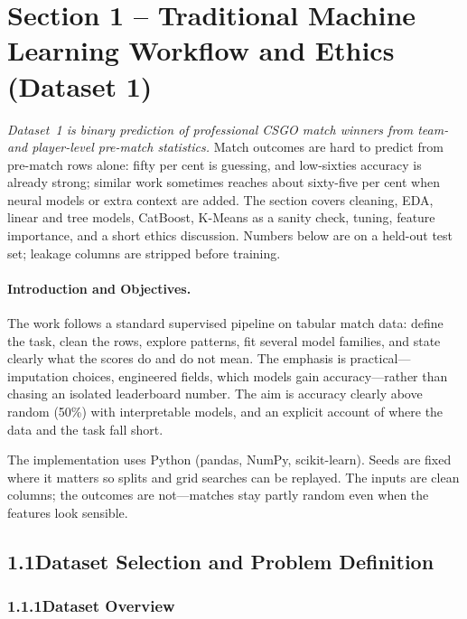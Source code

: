 \documentclass[12pt,a4paper]{article}
\begin{document}
\section{Section 1 -- Traditional Machine Learning Workflow and Ethics (Dataset 1)}

\noindent\textit{Dataset~1 is binary prediction of professional CSGO match winners from team- and player-level pre-match statistics.} Match outcomes are hard to predict from pre-match rows alone: fifty per cent is guessing, and low-sixties accuracy is already strong; similar work sometimes reaches about sixty-five per cent when neural models or extra context are added. The section covers cleaning, EDA, linear and tree models, CatBoost, K-Means as a sanity check, tuning, feature importance, and a short ethics discussion. Numbers below are on a held-out test set; leakage columns are stripped before training.

\paragraph{Introduction and Objectives.}
The work follows a standard supervised pipeline on tabular match data: define the task, clean the rows, explore patterns, fit several model families, and state clearly what the scores do and do not mean. The emphasis is practical---imputation choices, engineered fields, which models gain accuracy---rather than chasing an isolated leaderboard number. The aim is accuracy clearly above random (50\%) with interpretable models, and an explicit account of where the data and the task fall short.

The implementation uses Python (pandas, NumPy, scikit-learn). Seeds are fixed where it matters so splits and grid searches can be replayed. The inputs are clean columns; the outcomes are not---matches stay partly random even when the features look sensible.

\subsection{1.1\quad Dataset Selection and Problem Definition}

\subsubsection{1.1.1\quad Dataset Overview}
\end{document}
